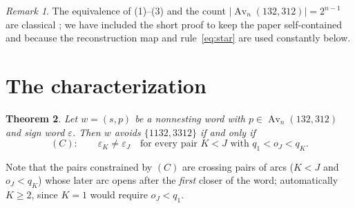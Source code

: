 \documentclass[11pt]{article}
\newtheorem{theorem}{Theorem}[section]
\theoremstyle{definition}
\theoremstyle{remark}
\newtheorem{remark}[theorem]{Remark}
\newcommand{\Av}{\operatorname{Av}}
\begin{document}
\begin{remark}
The equivalence of (1)--(3) and the count $|\Av_n(132,312)|=2^{n-1}$ are
classical \cite{SimionSchmidt}; we have included the short proof to keep
the paper self-contained and because the reconstruction map and
rule~\eqref{eq:star} are used constantly below.
\end{remark}

\section{The characterization}\label{sec:thmA}

\begin{theorem}\label{thm:A}
Let $w=(s,p)$ be a nonnesting word with $p\in\Av_n(132,312)$ and sign word
$\varepsilon$. Then $w$ avoids $\{1132,3312\}$ if and only if
\[
 (C)\colon\qquad \varepsilon_K\neq\varepsilon_J
 \quad\text{for every pair } K<J \text{ with } q_1<o_J<q_K.
\]
\end{theorem}

Note that the pairs constrained by $(C)$ are crossing pairs of arcs
($K<J$ and $o_J<q_K$) whose later arc opens after the \emph{first} closer of
the word; automatically $K\ge2$, since $K=1$ would require $o_J<q_1$.
\end{document}
